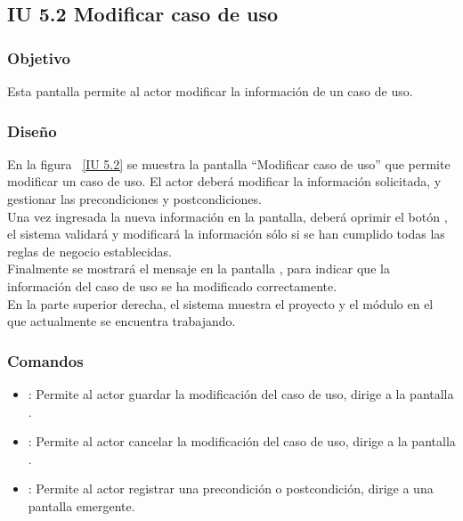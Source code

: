 \newpage 
\subsection{IU 5.2 Modificar caso de uso}

\subsubsection{Objetivo}
	
	Esta pantalla permite al actor modificar la información de un caso de uso.

\subsubsection{Diseño}

    En la figura ~\ref{IU 5.2} se muestra la pantalla ``Modificar caso de uso'' que permite modificar un caso de uso. El actor deberá modificar la información solicitada, y gestionar las precondiciones y postcondiciones.\\
    
    Una vez ingresada la nueva información en la pantalla, deberá oprimir el botón , el sistema validará y modificará la información sólo si se han cumplido todas las reglas de negocio establecidas.  \\
    
    Finalmente se mostrará el mensaje  en la pantalla , para indicar que la información del caso de uso se ha modificado correctamente.\\
	En la parte superior derecha, el sistema muestra el proyecto y el módulo en el que actualmente se encuentra trabajando.
	   


    


\subsubsection{Comandos}
\begin{itemize}
	\item {}: Permite al actor guardar la modificación del caso de uso, dirige a la pantalla .
	\item {}: Permite al actor cancelar la modificación del caso de uso, dirige a la pantalla .
	\item \btnRegistrar: Permite al actor registrar una precondición o postcondición, dirige a una pantalla emergente.
\end{itemize}

